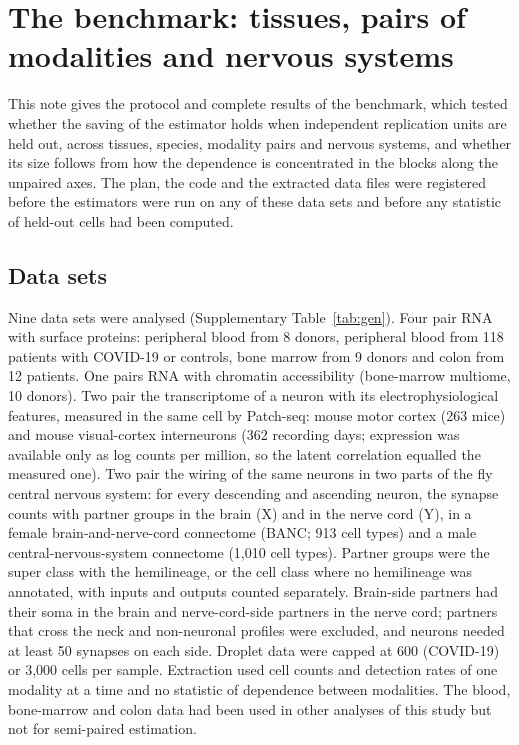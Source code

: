 \section{The benchmark: tissues, pairs of modalities and nervous systems}\label{sec:gen}

This note gives the protocol and complete results of the benchmark, which tested whether the saving of the estimator holds when independent replication units are held out, across tissues, species, modality pairs and nervous systems, and whether its size follows from how the dependence is concentrated in the blocks along the unpaired axes. The plan, the code and the extracted data files were registered before the estimators were run on any of these data sets and before any statistic of held-out cells had been computed.

\subsection*{Data sets}
Nine data sets were analysed (Supplementary Table~\ref{tab:gen}). Four pair RNA with surface proteins: peripheral blood from 8 donors\cite{hao2021}, peripheral blood from 118 patients with COVID-19 or controls\cite{stephenson2021}, bone marrow from 9 donors and colon from 12 patients\cite{mennillo2024}. One pairs RNA with chromatin accessibility (bone-marrow multiome, 10 donors). Two pair the transcriptome of a neuron with its electrophysiological features, measured in the same cell by Patch-seq: mouse motor cortex\cite{scala2021} (263 mice) and mouse visual-cortex interneurons\cite{gouwens2020,gala2021} (362 recording days; expression was available only as log counts per million, so the latent correlation equalled the measured one). Two pair the wiring of the same neurons in two parts of the fly central nervous system: for every descending and ascending neuron, the synapse counts with partner groups in the brain (X) and in the nerve cord (Y), in a female brain-and-nerve-cord connectome\cite{bates2026} (BANC; 913 cell types) and a male central-nervous-system connectome\cite{berg2025} (1,010 cell types). Partner groups were the super class with the hemilineage, or the cell class where no hemilineage was annotated, with inputs and outputs counted separately. Brain-side partners had their soma in the brain and nerve-cord-side partners in the nerve cord; partners that cross the neck and non-neuronal profiles were excluded, and neurons needed at least 50 synapses on each side. Droplet data were capped at 600 (COVID-19) or 3,000 cells per sample. Extraction used cell counts and detection rates of one modality at a time and no statistic of dependence between modalities. The blood, bone-marrow and colon data had been used in other analyses of this study but not for semi-paired estimation.

